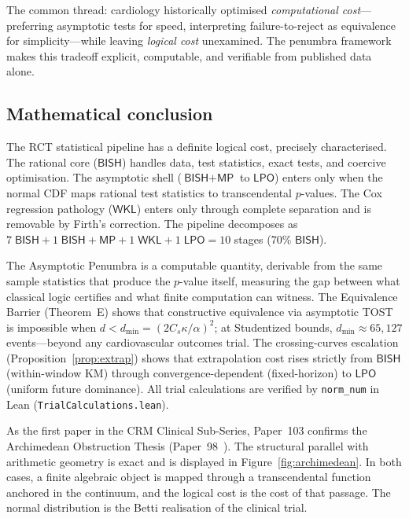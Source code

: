 \documentclass[11pt,a4paper]{article}
\theoremstyle{plain}
\theoremstyle{definition}
\newcommand{\BISH}{\textsf{BISH}}
\newcommand{\WKL}{\textsf{WKL}}
\newcommand{\LPO}{\textsf{LPO}}
\newcommand{\MP}{\textsf{MP}}
\begin{document}
The common thread: cardiology historically optimised \emph{computational cost}---preferring asymptotic tests for speed, interpreting failure-to-reject as equivalence for simplicity---while leaving \emph{logical cost} unexamined.  The penumbra framework makes this tradeoff explicit, computable, and verifiable from published data alone.

\subsection*{Mathematical conclusion}

The RCT statistical pipeline has a definite logical cost, precisely characterised.  The rational core ($\BISH$) handles data, test statistics, exact tests, and coercive optimisation.  The asymptotic shell ($\BISH + \MP$ to $\LPO$) enters only when the normal CDF maps rational test statistics to transcendental $p$-values.  The Cox regression pathology ($\WKL$) enters only through complete separation and is removable by Firth's correction.  The pipeline decomposes as $7\;\BISH + 1\;\BISH{+}\MP + 1\;\WKL + 1\;\LPO = 10$ stages (70\% $\BISH$).

The Asymptotic Penumbra is a computable quantity, derivable from the same sample statistics that produce the $p$-value itself, measuring the gap between what classical logic certifies and what finite computation can witness.  The Equivalence Barrier (Theorem~E) shows that constructive equivalence via asymptotic TOST is impossible when $d < d_{\min} = (2C_s\kappa/\alpha)^2$; at Studentized bounds, $d_{\min} \approx 65{,}127$ events---beyond any cardiovascular outcomes trial.  The crossing-curves escalation (Proposition~\ref{prop:extrap}) shows that extrapolation cost rises strictly from $\BISH$ (within-window KM) through convergence-dependent (fixed-horizon) to $\LPO$ (uniform future dominance).  All trial calculations are verified by \texttt{norm\_num} in Lean (\texttt{TrialCalculations.lean}).

As the first paper in the CRM Clinical Sub-Series, Paper~103 confirms the Archimedean Obstruction Thesis (Paper~98~\cite{lee-crm-p98}).  The structural parallel with arithmetic geometry is exact and is displayed in Figure~\ref{fig:archimedean}.  In both cases, a finite algebraic object is mapped through a transcendental function anchored in the continuum, and the logical cost is the cost of that passage.  The normal distribution is the Betti realisation of the clinical trial.
\end{document}
